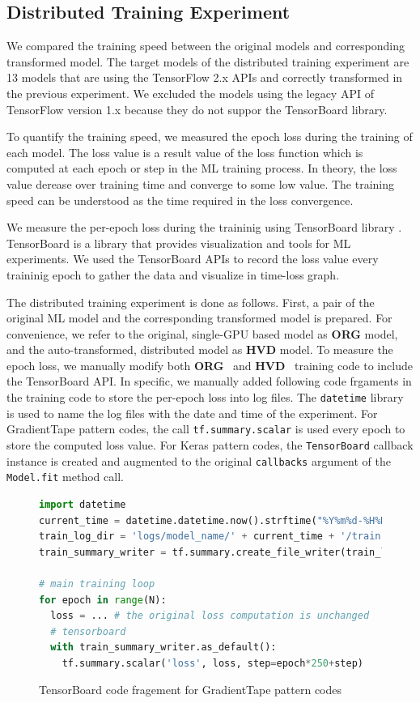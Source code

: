\subsection{Distributed Training Experiment}

We compared the training speed between the original models and
corresponding transformed model. 
The target models of the distributed training experiment are 
13 models that are using the TensorFlow 2.x APIs and correctly
transformed in the previous experiment.
We excluded the models using the legacy API of
TensorFlow version 1.x because they do not suppor the TensorBoard library. 

To quantify the training speed, we measured the epoch loss during the training
of each model.
The loss value is a result value of the loss function which is computed
at each epoch or step in the ML training process.
In theory, the loss value derease over training time and converge
to some low value.
The training speed can be understood as the time required in the
loss convergence.

We measure the per-epoch loss during the traininig using
TensorBoard library \cite{tensorboard}. 
TensorBoard is a library that provides visualization and tools
for ML experiments.
We used the TensorBoard APIs to record the loss value every traininig epoch
to gather the data and visualize in time-loss graph.

\newcommand{\orgbf}{\textbf{ORG}}
\newcommand{\hvdbf}{\textbf{HVD}}

The distributed training experiment is done as follows.
First, a pair of the original ML model and the corresponding transformed model
is prepared. For convenience, we refer to the original, single-GPU based model
as \textbf{ORG} model, and the auto-transformed, distributed model as
\textbf{HVD} model. To measure the epoch loss, we manually modify both  
\orgbf ~ and \hvdbf ~ training code to include the TensorBoard API. 
In specific, we manually added following code frgaments in the training code to
store the per-epoch loss into log files.
The {\tt datetime} library is used to name the log files with
the date and time of the experiment.
For GradientTape pattern codes, the call
{\tt tf.summary.scalar} is used every epoch to store the
computed loss value.
For Keras pattern codes, the {\tt TensorBoard} callback instance is
created and augmented to the original {\tt callbacks} argument
of the {\tt Model.fit} method call.

\begin{figure}[!ht]
  \begin{lstlisting}[language=Python]
import datetime
current_time = datetime.datetime.now().strftime("%Y%m%d-%H%M%S")
train_log_dir = 'logs/model_name/' + current_time + '/train'
train_summary_writer = tf.summary.create_file_writer(train_log_dir)

# main training loop
for epoch in range(N): 
  loss = ... # the original loss computation is unchanged
  # tensorboard
  with train_summary_writer.as_default():
    tf.summary.scalar('loss', loss, step=epoch*250+step)
  \end{lstlisting}
  \caption{TensorBoard code fragement for GradientTape pattern codes}
\end{figure}


